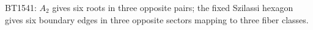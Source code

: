 \begin{center}\small
BT1541: $A_2$ gives six roots in three opposite pairs; the fixed Szilassi hexagon gives six boundary edges in three opposite sectors mapping to three fiber classes.
\end{center}
